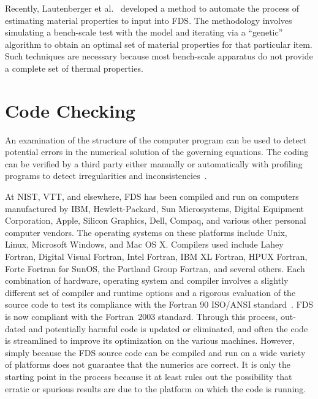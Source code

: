\documentclass[11pt]{book}
\begin{document}
Recently, Lautenberger et al.~\cite{Lautenberger:FSJ} developed a method to automate the
process of  estimating material properties to input  into FDS. The methodology involves simulating a  bench-scale test with the model and iterating
via a ``genetic'' algorithm  to obtain  an  optimal set  of material  properties for  that  particular item.  Such techniques  are necessary because
most bench-scale apparatus do not provide a complete set of thermal properties.



\section{Code Checking}
\label{Code Checking}

An examination of the structure of the computer program can be used to detect potential errors in the numerical solution of the governing equations.
The coding can be verified by a third party either manually or automatically with profiling programs to detect irregularities and
inconsistencies~\cite{ASTM:E1355}.

At NIST, VTT, and elsewhere, FDS has been compiled and run on computers manufactured by IBM, Hewlett-Packard, Sun Microsystems, Digital Equipment
Corporation, Apple, Silicon Graphics, Dell, Compaq, and various other personal computer vendors. The operating systems on these platforms include
Unix, Linux, Microsoft Windows, and Mac OS X. Compilers used include Lahey Fortran, Digital Visual Fortran, Intel Fortran, IBM XL Fortran, HPUX
Fortran, Forte Fortran for SunOS, the Portland Group Fortran, and several others. Each combination of hardware, operating system and compiler
involves a slightly different set of compiler and runtime options and a rigorous evaluation of the source code to test its compliance with the
Fortran 90 ISO/ANSI standard~\cite{F90}. FDS is now compliant with the Fortran~2003 standard. Through this process, out-dated and potentially harmful code is updated or eliminated, and often the code is
streamlined to improve its optimization on the various machines. However, simply because the FDS source code can be compiled and run on a wide
variety of platforms does not guarantee that the numerics are correct. It is only the starting point in the process because it at least rules out the
possibility that erratic or spurious results are due to the platform on which the code is running.
\end{document}
